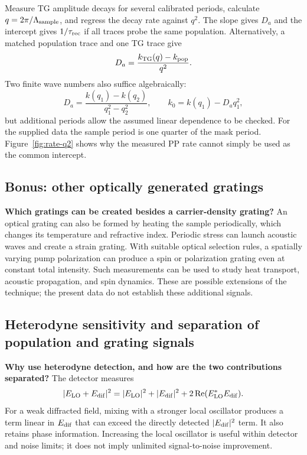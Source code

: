 Measure TG amplitude decays for several calibrated periods, calculate $q=2\pi/\Lambda_{\rm sample}$, and regress the decay rate against $q^2$. The slope gives $D_a$ and the intercept gives $1/\tau_{\rm rec}$ if all traces probe the same population. Alternatively, a matched population trace and one TG trace give
\begin{equation}
D_a=\frac{k_{\rm TG}(q)-k_{\rm pop}}{q^2}.
\end{equation}
Two finite wave numbers also suffice algebraically:
\begin{equation}
D_a=\frac{k(q_1)-k(q_2)}{q_1^2-q_2^2},
\qquad k_0=k(q_1)-D_aq_1^2,
\end{equation}
but additional periods allow the assumed linear dependence to be checked. For the supplied data the sample period is one quarter of the mask period. Figure~\ref{fig:rate-q2} shows why the measured PP rate cannot simply be used as the common intercept.

\subsection{Bonus: other optically generated gratings}
\textbf{Which gratings can be created besides a carrier-density grating?}
An optical grating can also be formed by heating the sample periodically, which changes its temperature and refractive index. Periodic stress can launch acoustic waves and create a strain grating. With suitable optical selection rules, a spatially varying pump polarization can produce a spin or polarization grating even at constant total intensity. Such measurements can be used to study heat transport, acoustic propagation, and spin dynamics. These are possible extensions of the technique; the present data do not establish these additional signals.

\subsection{Heterodyne sensitivity and separation of population and grating signals}
\textbf{Why use heterodyne detection, and how are the two contributions separated?}
The detector measures
\begin{equation}
|E_{\rm LO}+E_{\rm dif}|^2
=|E_{\rm LO}|^2+|E_{\rm dif}|^2
+2\operatorname{Re}(E_{\rm LO}^*E_{\rm dif}).
\end{equation}
For a weak diffracted field, mixing with a stronger local oscillator produces a term linear in $E_{\rm dif}$ that can exceed the directly detected $|E_{\rm dif}|^2$ term. It also retains phase information. Increasing the local oscillator is useful within detector and noise limits; it does not imply unlimited signal-to-noise improvement.

